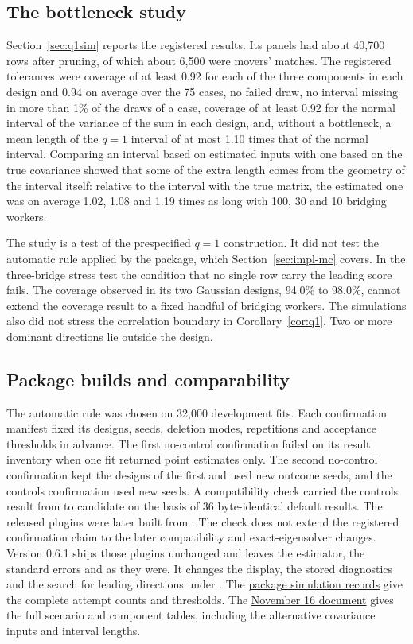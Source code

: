 \subsection{The bottleneck study}
Section~\ref{sec:q1sim} reports the registered results. Its panels had about 40,700
rows after pruning, of which about 6,500 were movers' matches. The registered
tolerances were coverage of at least 0.92 for each of the three components in each
design and 0.94 on average over the 75 cases, no failed draw, no interval missing in
more than 1\% of the draws of a case, coverage of at least 0.92 for the normal interval
of the variance of the sum in each design, and, without a bottleneck, a mean length of
the $q=1$ interval of at most 1.10 times that of the normal interval. Comparing an
interval based on estimated inputs with one based on the true covariance showed that
some of the extra length comes from the geometry of the interval itself: relative to
the interval with the true matrix, the estimated one was on average 1.02, 1.08 and
1.19 times as long with 100, 30 and 10 bridging workers.

The study is a test of the prespecified $q=1$ construction. It did not test the
automatic rule applied by the package, which Section~\ref{sec:impl-mc} covers.
In the three-bridge stress test the condition that no single row carry the
leading score fails. The coverage observed in its two Gaussian designs, 94.0\% to
98.0\%, cannot extend the coverage result to a fixed handful of bridging workers. The
simulations also did not stress the correlation boundary in
Corollary~\ref{cor:q1}. Two or more dominant directions lie outside the design.

\subsection{Package builds and comparability}
The automatic rule was chosen on 32,000 development fits. Each confirmation
manifest fixed its designs, seeds, deletion modes, repetitions and
acceptance thresholds in advance. The first no-control confirmation failed
on its result inventory when one fit returned point estimates only. The
second no-control confirmation kept the designs of the first and used new
outcome seeds, and the controls confirmation used new seeds. A compatibility check carried the controls
result from  to candidate  on the basis of
36 byte-identical default results. The released plugins were later built
from . The check does not extend the registered confirmation
claim to the later compatibility and exact-eigensolver changes. Version 0.6.1
ships those plugins unchanged and leaves the estimator, the standard errors and
 as they were. It changes the display, the stored diagnostics and the
search for leading directions under .
The \href{https://github.com/johannes-schmieder/fevc/tree/59bf4094/fevc/docs/default_interval}{package simulation records}
give the complete attempt counts and thresholds.
The \href{https://github.com/johannes-schmieder/fevc/blob/59bf4094/fevc/docs/repeat_measurement/unified/se_unified_20261116.pdf}{November 16 document}
gives the full scenario and component tables, including the alternative
covariance inputs and interval lengths.

